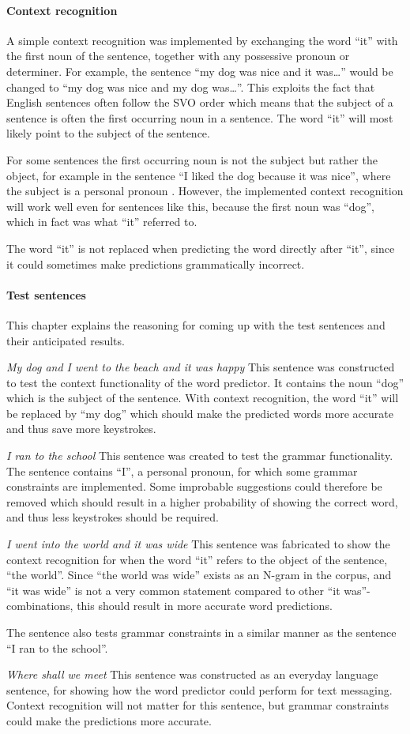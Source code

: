 \paragraph{Context recognition}
A simple context recognition was implemented by exchanging the word “it” with the first noun of the sentence, together with any possessive pronoun or determiner. For example, the sentence “my dog was nice and it was…” would be changed to “my dog was nice and my dog was…”. This exploits the fact that English sentences often follow the SVO order which means that the subject of a sentence is often the first occurring noun in a sentence. The word “it” will most likely point to the subject of the sentence.

For some sentences the first occurring noun is not the subject but rather the object, for example in the sentence “I liked the dog because it was nice”, where the subject is a personal pronoun . However, the implemented context recognition will work well even for sentences like this, because the first noun was “dog”, which in fact was what “it” referred to.

The word “it” is not replaced when predicting the word directly after “it”, since it could sometimes make predictions grammatically incorrect.

\paragraph{Test sentences}
This chapter explains the reasoning for coming up with the test sentences and their anticipated results.

\emph{My dog and I went to the beach and it was happy}
This sentence was constructed to test the context functionality of the word predictor. It contains the noun “dog” which is the subject of the sentence. With context recognition, the word “it” will be replaced by “my dog” which should make the predicted words more accurate and thus save more keystrokes.

\emph{I ran to the school}
This sentence was created to test the grammar functionality. The sentence contains “I”, a personal pronoun, for which some grammar constraints are implemented. Some improbable suggestions could therefore be removed which should result in a higher probability of showing the correct word, and thus less keystrokes should be required.

\emph{I went into the world and it was wide}
This sentence was fabricated to show the context recognition for when the word “it” refers to the object of the sentence, “the world”. Since “the world was wide” exists as an N-gram in the corpus, and “it was wide” is not a very common statement compared to other “it was”-combinations, this should result in more accurate word predictions.

The sentence also tests grammar constraints in a similar manner as the sentence “I ran to the school”.

\emph{Where shall we meet}
This sentence was constructed as an everyday language sentence, for showing how the word predictor could perform for text messaging. Context recognition will not matter for this sentence, but grammar constraints could make the predictions more accurate.